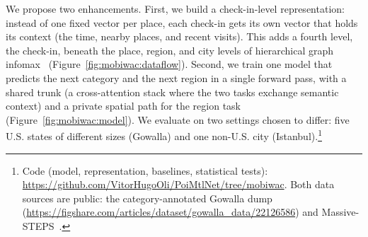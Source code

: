 We propose two enhancements. First, we build a check-in-level representation: instead of one fixed vector per place, each check-in gets its own vector that holds its context (the time, nearby places, and recent visits).
This adds a fourth level, the check-in, beneath the place, region, and city levels of hierarchical graph infomax~\cite{huang2023hgi,velickovic2019deep} (Figure~\ref{fig:mobiwac:dataflow}). Second, we train one model that
predicts the next category and the next region in a single forward pass, with a shared trunk (a cross-attention stack where the two tasks exchange
semantic context) and a private spatial path for the region task (Figure~\ref{fig:mobiwac:model}). We evaluate on two settings chosen to differ: five U.S. states of different sizes (Gowalla) and one non-U.S. city (Istanbul).\footnote{\label{fn:mobiwac:code}Code (model, representation, baselines, statistical tests): \url{https://github.com/VitorHugoOli/PoiMtlNet/tree/mobiwac}. Both data sources are public: the category-annotated Gowalla dump (\url{https://figshare.com/articles/dataset/gowalla_data/22126586}) and Massive-STEPS~\cite{wongso2025massivesteps}.}

